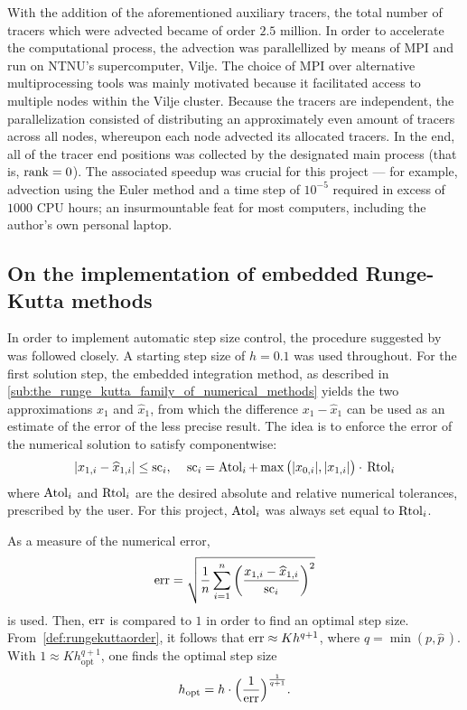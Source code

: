 With the addition of the aforementioned auxiliary tracers, the total number
of tracers which were advected became of order $2.5$ million. In order to
accelerate the computational process, the advection was parallellized by means
of MPI and run on NTNU's supercomputer, Vilje. The choice of MPI over
alternative multiprocessing tools was mainly motivated because it facilitated
access to multiple nodes within the Vilje cluster. Because the tracers are
independent, the parallelization consisted of distributing an approximately
even amount of tracers across all nodes, whereupon each node advected its
allocated tracers. In the end, all of the tracer end positions was collected
by the designated main process (that is, $\textnormal{rank}=0$). The
associated speedup was crucial for this project --- for example, advection using
the Euler method and a time step of $10^{-5}$ required in excess of $1000$
CPU hours; an insurmountable feat for most computers, including the author's own
personal laptop.
\clearpage
\subsection{On the implementation of embedded Runge-Kutta methods}
\label{sub:on_the_implementation_of_embedded_runge_kutta_methods}

In order to implement automatic step size control, the procedure suggested
by \textcite[pp.167--168]{hairer1993solving} was followed
closely. A starting step size of $h=0.1$ was used throughout. For the first
solution step, the embedded integration method, as described in
\cref{sub:the_runge_kutta_family_of_numerical_methods} yields the two
approximations $x_{1}$ and $\widehat{x}_{1}$, from which the difference
$x_{1}-\widehat{x}_{1}$ can be used as an estimate of the error of the less
precise result. The idea is to enforce the error of the numerical solution to
satisfy componentwise:
\begin{equation}
    \label{eq:embeddederror}
    \abs{x_{1,i}-\widehat{x}_{1,i}} \leq \scem_{i},\quad{}%
    \scem_{i}=\atol_{i}+\max\big(\abs{x_{0,i}},\abs{x_{1,i}}\big)\cdot{}\rtol_{i}
\end{equation}
where $\operatorname{Atol}_{i}$ and $\operatorname{Rtol}_{i}$ are the desired absolute and relative
numerical tolerances, prescribed by the user. For this project, $\operatorname{Atol}_{i}$ was
always set equal to $\operatorname{Rtol}_{i}$.

As a measure of the numerical error,
\begin{equation}
    \label{eq:embeddednumericalerror}
    \errem = \sqrt{\frac{1}{n}\sum\limits_{i=1}^{n}%
    {\bigg(\frac{x_{1,i}-\widehat{x}_{1,i}}{\scem_{i}}\bigg)}^{2}}
\end{equation}
is used. Then, $\operatorname{err}$ is compared to $1$ in order to find an optimal step
size. From~\cref{def:rungekuttaorder}, it follows that $\operatorname{err}\approx{}Kh^{q+1}$,
where $q=\min(p,\widehat{p}\,)$. With $1\approx{}Kh_{\mathrm{opt}}^{q+1}$,
one finds the optimal step size
\begin{equation}
    \label{eq:embeddedoptimalstepsize}
    h_{\mathrm{opt}}=h\cdot\Big(\frac{1}{\operatorname{err}}\Big)^{\frac{1}{q+1}}.
\end{equation}

